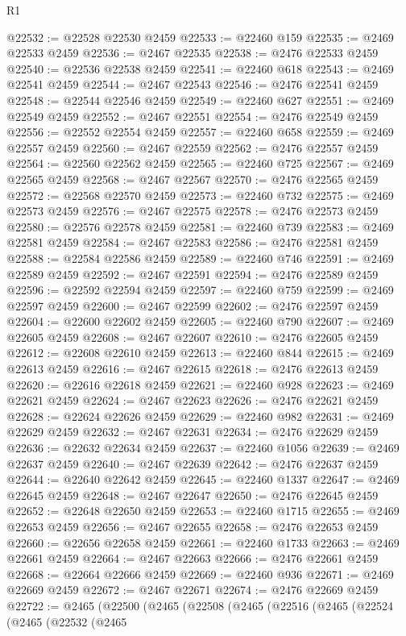 \begin{lexlean}{R1}
\begin{coremodule}
@22532 := @22528 @22530 @2459
@22533 := @22460 @159
@22535 := @2469 @22533 @2459
@22536 := @2467 @22535
@22538 := @2476 @22533 @2459
@22540 := @22536 @22538 @2459
@22541 := @22460 @618
@22543 := @2469 @22541 @2459
@22544 := @2467 @22543
@22546 := @2476 @22541 @2459
@22548 := @22544 @22546 @2459
@22549 := @22460 @627
@22551 := @2469 @22549 @2459
@22552 := @2467 @22551
@22554 := @2476 @22549 @2459
@22556 := @22552 @22554 @2459
@22557 := @22460 @658
@22559 := @2469 @22557 @2459
@22560 := @2467 @22559
@22562 := @2476 @22557 @2459
@22564 := @22560 @22562 @2459
@22565 := @22460 @725
@22567 := @2469 @22565 @2459
@22568 := @2467 @22567
@22570 := @2476 @22565 @2459
@22572 := @22568 @22570 @2459
@22573 := @22460 @732
@22575 := @2469 @22573 @2459
@22576 := @2467 @22575
@22578 := @2476 @22573 @2459
@22580 := @22576 @22578 @2459
@22581 := @22460 @739
@22583 := @2469 @22581 @2459
@22584 := @2467 @22583
@22586 := @2476 @22581 @2459
@22588 := @22584 @22586 @2459
@22589 := @22460 @746
@22591 := @2469 @22589 @2459
@22592 := @2467 @22591
@22594 := @2476 @22589 @2459
@22596 := @22592 @22594 @2459
@22597 := @22460 @759
@22599 := @2469 @22597 @2459
@22600 := @2467 @22599
@22602 := @2476 @22597 @2459
@22604 := @22600 @22602 @2459
@22605 := @22460 @790
@22607 := @2469 @22605 @2459
@22608 := @2467 @22607
@22610 := @2476 @22605 @2459
@22612 := @22608 @22610 @2459
@22613 := @22460 @844
@22615 := @2469 @22613 @2459
@22616 := @2467 @22615
@22618 := @2476 @22613 @2459
@22620 := @22616 @22618 @2459
@22621 := @22460 @928
@22623 := @2469 @22621 @2459
@22624 := @2467 @22623
@22626 := @2476 @22621 @2459
@22628 := @22624 @22626 @2459
@22629 := @22460 @982
@22631 := @2469 @22629 @2459
@22632 := @2467 @22631
@22634 := @2476 @22629 @2459
@22636 := @22632 @22634 @2459
@22637 := @22460 @1056
@22639 := @2469 @22637 @2459
@22640 := @2467 @22639
@22642 := @2476 @22637 @2459
@22644 := @22640 @22642 @2459
@22645 := @22460 @1337
@22647 := @2469 @22645 @2459
@22648 := @2467 @22647
@22650 := @2476 @22645 @2459
@22652 := @22648 @22650 @2459
@22653 := @22460 @1715
@22655 := @2469 @22653 @2459
@22656 := @2467 @22655
@22658 := @2476 @22653 @2459
@22660 := @22656 @22658 @2459
@22661 := @22460 @1733
@22663 := @2469 @22661 @2459
@22664 := @2467 @22663
@22666 := @2476 @22661 @2459
@22668 := @22664 @22666 @2459
@22669 := @22460 @936
@22671 := @2469 @22669 @2459
@22672 := @2467 @22671
@22674 := @2476 @22669 @2459
@22722 := @2465
    (@22500
      (@2465
        (@22508
          (@2465
            (@22516
              (@2465
                (@22524
                  (@2465
                    (@22532
                      (@2465

\end{coremodule}
\end{lexlean}
